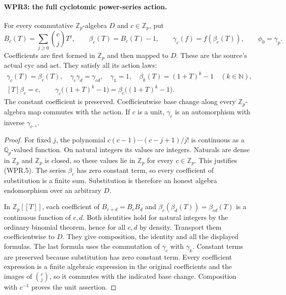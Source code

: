 \paragraph{WPR3: the full cyclotomic power-series action.}
\label{claim:WPR3}
For every commutative $\mathbb Z_p$-algebra $D$ and $c\in\mathbb Z_p$,
put
\[
 B_c(T)=\sum_{j\geq0}\binom cjT^j,\qquad
 \beta_c(T)=B_c(T)-1,\qquad
 \gamma_c(f)=f(\beta_c(T)),\qquad \phi_0=\gamma_p.
 \tag{WPR.5}
\]
Coefficients are first formed in $\mathbb Z_p$ and then mapped
to $D$. These are the source's actual $\mathrm{cyc}$ and
$\mathrm{act}$. They satisfy all its action laws:
\[
 \begin{gathered}
 \gamma_c(T)=\beta_c(T),\quad
 \gamma_c\gamma_d=\gamma_{cd},\quad \gamma_1=1,\quad
 \beta_k(T)=(1+T)^k-1\quad(k\in\mathbb N),\\
 [T]\beta_c=c,\qquad
 \gamma_c\big((1+T)^k-1\big)
       =\beta_c\big((1+T)^k-1\big).
 \end{gathered}                                                     \tag{WPR.6}
\]
The constant coefficient is preserved. Coefficientwise base change
along every $\mathbb Z_p$-algebra map commutes with the action.
If $c$ is a unit, $\gamma_c$ is an automorphism with inverse
$\gamma_{c^{-1}}$.

\begin{proof}
For fixed $j$, the polynomial $c(c-1)\cdots(c-j+1)/j!$ is
continuous as a $\mathbb Q_p$-valued function. On natural integers
its values are integers. Naturals are dense in $\mathbb Z_p$ and
$\mathbb Z_p$ is closed, so these values lie in $\mathbb Z_p$
for every $c\in\mathbb Z_p$. This justifies (WPR.5).
The series $\beta_c$ has zero constant term, so every coefficient
of substitution is a finite sum. Substitution is therefore an
honest algebra endomorphism over an arbitrary $D$.

In $\mathbb Z_p[[T]]$, each coefficient of
$B_{c+d}=B_cB_d$ and $\beta_c(\beta_d(T))=\beta_{cd}(T)$ is a
continuous function of $c,d$. Both identities hold for natural
integers by the ordinary binomial theorem, hence for all $c,d$
by density. Transport them coefficientwise to $D$. They give
composition, the identity and all the displayed formulas. The
last formula uses the commutation of $\gamma_c$ with $\gamma_k$.
Constant terms are preserved because substitution has zero
constant term. Every coefficient expression is a finite algebraic
expression in the original coefficients and the images of
$\binom cj$, so it commutes with the indicated base change.
Composition with $c^{-1}$ proves the unit assertion.
\end{proof}


